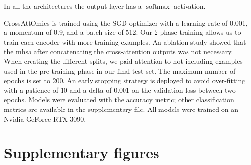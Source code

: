     In all the architectures the output layer has a \(\operatorname{softmax}\) activation.

     CrossAttOmics is trained using the SGD optimizer with a learning rate of 0.001, a momentum of 0.9, and a batch size of 512.
     Our 2-phase training allows us to train each encoder with more training examples.
     An ablation study showed that the \gls{mhsa} after concatenating the cross-attention outputs was not necessary.
     When creating the different splits, we paid attention to not including examples used in the pre-training phase in our final test set.
     The maximum number of epochs is set to 200.
     An early stopping strategy is deployed to avoid over-fitting with a patience of 10 and a delta of 0.001 on the validation loss between two epochs.
     Models were evaluated with the accuracy metric; other classification metrics are available in the supplementary file.
     All models were trained on an Nvidia GeForce RTX 3090.

     \newpage
\section{Supplementary figures}

